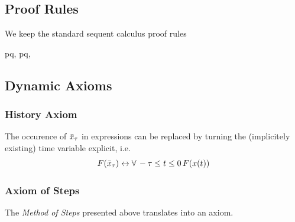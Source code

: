\documentclass[10pt]{article}
\begin{document}
    \subsection{Proof Rules}
        \label{sec:seq-calc-proof-rules}

        We keep the standard sequent calculus proof rules

        \begin{calculus}
           {
           {\lsequent{\Gamma} {p\land q,\Delta}}
           }{}
           {
           { {\Delta}}
           \quad
           }{}
           {
           {\lsequent{\Gamma} {p\limply q,\Delta}}
           }{}
        \end{calculus}


    \subsection{Dynamic Axioms}
        \label{sec:dynamic-axioms}

        \subsubsection{History Axiom}
            \label{history-axiom}

            The occurence of $\bar{x}_{\tau}$ in expressions can be replaced by turning the (implicitely existing) time variable explicit, i.e.\
            \begin{equation}
                F(\bar{x}_{\tau}) \leftrightarrow \forall\,-\tau\leq t\leq 0\, F(x(t))
            \end{equation}

        \subsubsection{Axiom of Steps}
            \label{sec:axiom-of-steps}
            The \emph{Method of Steps} presented above translates into an axiom.
\end{document}
